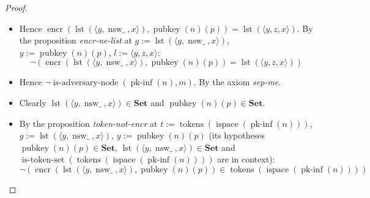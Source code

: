 \documentclass[11pt]{article}
\theoremstyle{plain}
\begin{document}
\begin{proof}
\begin{itemize}[leftmargin=2.8em, itemsep=4pt, parsep=1pt]
\begin{itemize}[leftmargin=2.8em, itemsep=4pt, parsep=1pt]
  \item[\textbf{304--305}] Hence $\operatorname{encr}(\operatorname{lst}(\langle y, \operatorname{nsw\_}, x \rangle), \operatorname{pubkey}(n)(p)) = \operatorname{lst}(\langle y, z, x \rangle)$. By the proposition \emph{encr-ne-list} at $g := \operatorname{lst}(\langle y, \operatorname{nsw\_}, x \rangle)$, $y := \operatorname{pubkey}(n)(p)$, $l := \langle y, z, x \rangle$:
\begin{equation*}
\neg (\operatorname{encr}(\operatorname{lst}(\langle y, \operatorname{nsw\_}, x \rangle), \operatorname{pubkey}(n)(p)) = \operatorname{lst}(\langle y, z, x \rangle))
\end{equation*}

  \item[\textbf{306--307}] Hence $\neg \operatorname{is\text{-}adversary\text{-}node}(\operatorname{pk\text{-}inf}(n), m)$. By the axiom \emph{sep-me}.
  \item[\textbf{308--309}] Clearly $\operatorname{lst}(\langle y, \operatorname{nsw\_}, x \rangle) \in \mathbf{Set}$ and $\operatorname{pubkey}(n)(p) \in \mathbf{Set}$.
  \item[\textbf{310}] By the proposition \emph{token-not-encr} at $t := \operatorname{tokens}(\operatorname{ispace}(\operatorname{pk\text{-}inf}(n)))$, $g := \operatorname{lst}(\langle y, \operatorname{nsw\_}, x \rangle)$, $y := \operatorname{pubkey}(n)(p)$ (its hypotheses $\operatorname{pubkey}(n)(p) \in \mathbf{Set}$, $\operatorname{lst}(\langle y, \operatorname{nsw\_}, x \rangle) \in \mathbf{Set}$ and $\operatorname{is\text{-}token\text{-}set}(\operatorname{tokens}(\operatorname{ispace}(\operatorname{pk\text{-}inf}(n))))$ are in context):
\begin{equation*}
\neg (\operatorname{encr}(\operatorname{lst}(\langle y, \operatorname{nsw\_}, x \rangle), \operatorname{pubkey}(n)(p)) \in \operatorname{tokens}(\operatorname{ispace}(\operatorname{pk\text{-}inf}(n))))
\end{equation*}


\end{itemize}
\end{itemize}
\end{proof}
\end{document}
